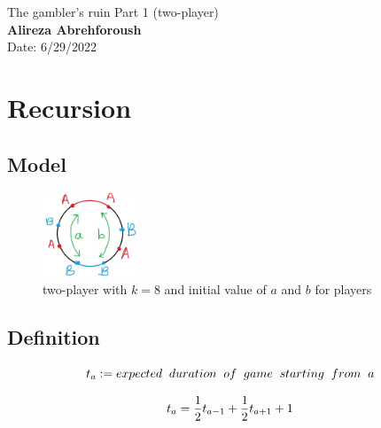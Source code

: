 \documentclass[]{book}
\theoremstyle{definition}
\newcommand{\bb}[1]{\mathbb{#1}}
\newcommand{\R}{\bb{R}}
\newcommand{\textdf}[1]{\textbf{\textsf{#1}}\index{#1}}
\begin{document}
\begin{center}
{\Large The gambler's ruin \hspace{0.5cm} Part 1 (two-player)}\\
\textbf{Alireza Abrehforoush}\\ %
Date: 6/29/2022 %
\end{center}

\vspace{0.2 cm}


\section*{Recursion}
\subsection*{Model}
\begin{figure}[h]
    \centering
    \includegraphics[width=0.25\textwidth]{model1.jpg}
    \caption{two-player with $k=8$ and initial value of $a$ and $b$ for players}
    \label{fig:mesh1}
\end{figure}


\subsection*{Definition}
$$
t_{a} := expected \hspace{0.2cm} duration \hspace{0.2cm} of \hspace{0.2cm} game \hspace{0.2cm} starting \hspace{0.2cm} from \hspace{0.2cm} a
\newline
$$

$$t_{a} = \frac{1}{2}t_{a-1} + \frac{1}{2}t_{a+1} + 1 \newline$$
\end{document}
